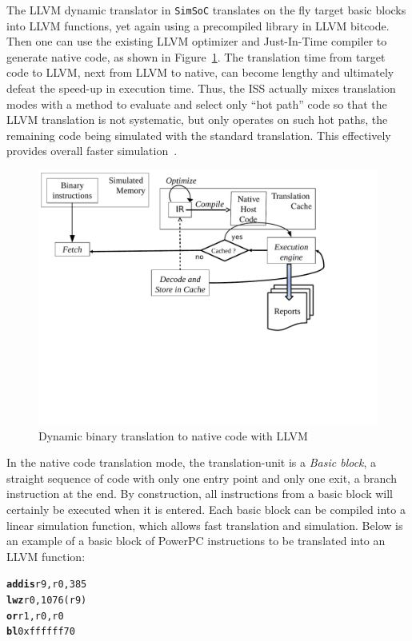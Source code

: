 \documentclass{llncs}
\newcommand{\simsoc}{\texttt{SimSoC}\xspace}
\begin{document}
The LLVM dynamic translator in \simsoc translates on the fly target
basic blocks into LLVM functions, yet again using a precompiled
library in LLVM bitcode. Then one can use the existing LLVM optimizer
and Just-In-Time compiler to generate native code, as shown in
Figure~\ref{fig:dyntrans-native}.  The translation time from target
code to LLVM, next from LLVM to native, can become lengthy and
ultimately defeat the speed-up in execution time. Thus, the ISS
actually mixes translation modes with a method to evaluate and select
only ``hot path'' code so that the LLVM translation is not systematic,
but only operates on such hot paths, the remaining code being
simulated with the standard translation. This effectively provides
overall faster simulation~\cite{simsoc-llvm-2011}.
\begin{figure}[!ht]
  \centering
  \includegraphics[scale=0.5, trim = 10mm 75mm 40mm 2mm clip=true]{fig/dyntrans-native.pdf}
  \caption{Dynamic binary translation to native code with LLVM}
  \label{fig:dyntrans-native}
\end{figure}

In the native code translation mode, the translation-unit is a
\textit{Basic block}, a straight sequence of code with only one entry
point and only one exit, a branch instruction at the end. By
construction, all instructions from a basic block will certainly be
executed when it is entered. Each basic block can be compiled into a
linear simulation function, which allows fast translation and
simulation.  Below is an example of a basic block of PowerPC
instructions to be translated into an LLVM function:
\begin{alltt}
  \textbf{addis} r9, r0, 385
  \textbf{lwz  } r0, 1076 (r9)
  \textbf{or   } r1, r0, r0
  \textbf{bl   } 0xffffff70
\end{alltt}
\end{document}
